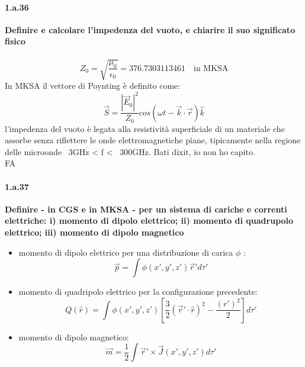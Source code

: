 \documentclass[twoside]{article}
\begin{document}
\paragraph{1.a.36}\textbf{Definire e calcolare l'impedenza del vuoto, e chiarire il suo significato fisico}\\
\\
\begin{equation}
    Z_0=\sqrt{\frac{\mu_0}{\epsilon_0}}=376.7303113461 \quad \text{in MKSA}
\end{equation}
In MKSA il vettore di Poynting è definito come:
\begin{equation}
    \vec{S}=\frac{|\vec{E}_0|^2}{Z_0}cos(\omega t-\vec{k}\cdot \vec{r})\hat{k}
\end{equation}
l'impedenza del vuoto è legata alla resistività
superficiale di un materiale che assorbe senza riflettere le onde elettromagnetiche piane, tipicamente nella regione delle microonde
~3GHz < f < ~300GHz. Bati dixit, io non ho capito.\\FA

\paragraph{1.a.37} \textbf{Definire - in CGS e in MKSA - per un sistema di cariche e correnti elettriche: i)
momento di dipolo elettrico; ii) momento di quadrupolo elettrico; iii) momento
di dipolo magnetico}\\
\begin{itemize}
    \item momento di dipolo elettrico per una distribuzione di carica $\phi$ :
    \begin{equation}
        \Vec{p}=\int\phi(x',y',z')\vec{r}'d\tau'
    \end{equation}
    \item momento di quadripolo elettrico per la configurazione precedente:
    \begin{equation}
        Q(\hat{r})=\int \phi(x',y',z')\left[\frac{3}{2} (\vec{r}'\cdot \hat{r})^2-\frac{(r')^2}{2}\right]d\tau'
    \end{equation}
    \item momento di dipolo magnetico:
    \begin{equation}
        \vec{m}=\frac{1}{2}\int \vec{r}' \times \vec{J}(x',y',z') d\tau'
    \end{equation}
\end{itemize}
    
\end{document}

